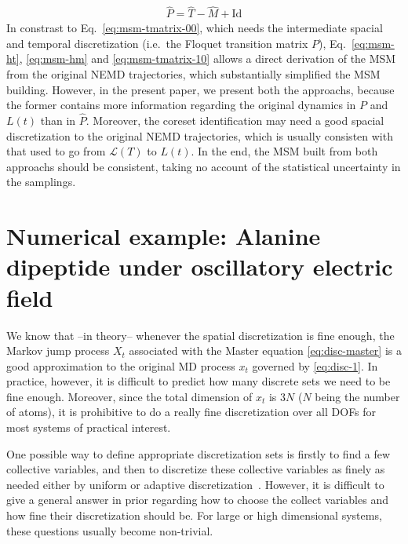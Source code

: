 \documentclass[aps, pre, preprint,unsortedaddress,a4paper,onecolumn]{revtex4}
\newcommand{\ml}[0]{\mathcal {L}}
\newcommand{\id}{\mathrm{Id}}
\begin{document}
\begin{align}\label{eq:msm-tmatrix-10}
  \hat P = \hat T - \hat M + \id
\end{align}
In constrast to Eq.~\eqref{eq:msm-tmatrix-00}, which needs the intermediate spacial and
temporal discretization (i.e.~the Floquet transition matrix $P$), 
Eq.~\eqref{eq:msm-ht}, \eqref{eq:msm-hm} and \eqref{eq:msm-tmatrix-10} allows a direct derivation of the MSM from the original NEMD
trajectories, which substantially simplified the MSM building.
However, in the present paper, we present both the approachs,
because the former contains more information regarding the original dynamics in $P$ and $L(t)$ than in $\hat P$.
Moreover, the coreset identification may need a good spacial discretization to the original NEMD trajectories, which is
usually consisten with that used to go from $\ml(T)$ to $L(t)$. In the end, the MSM
built from both approachs should be consistent, taking no account of the statistical uncertainty in the samplings.




\section{Numerical example:
  Alanine dipeptide under oscillatory electric field}
\label{sec:alanine}

We know that --in theory-- whenever the spatial discretization is fine enough, the Markov jump
process $X_t$ associated with the Master equation \eqref{eq:disc-master} is a good approximation to the original
MD process $x_t$ governed by \eqref{eq:disc-1}.  In practice, however, it is difficult to predict
how many discrete sets we need to be fine enough. Moreover, since the
total dimension of $x_t$ is $3N$ ($N$ being the number of atoms), it is prohibitive to do a really fine discretization
over all DOFs for most systems of practical interest.

One possible way to define appropriate discretization sets is firstly to find a few collective
variables, and then to discretize these collective variables as finely as needed either by uniform or adaptive
discretization~\cite{chodera2007automatic, prinz2011markov}.
However, it is difficult to give a general answer in prior regarding
how to choose the collect variables and how fine their discretization should be.
For large or high dimensional systems, these questions usually become non-trivial. 
\end{document}
